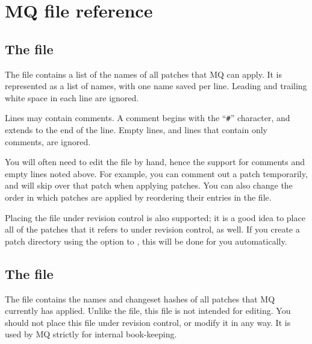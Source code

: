 \section{MQ file reference}


\subsection{The  file}

The  file contains a list of the names of all
patches that MQ can apply.  It is represented as a list of names, with
one name saved per line.  Leading and trailing white space in each
line are ignored.

Lines may contain comments.  A comment begins with the ``\texttt{\#}''
character, and extends to the end of the line.  Empty lines, and lines
that contain only comments, are ignored.

You will often need to edit the  file by hand, hence
the support for comments and empty lines noted above.  For example,
you can comment out a patch temporarily, and  will skip
over that patch when applying patches.  You can also change the order
in which patches are applied by reordering their entries in the
 file.

Placing the  file under revision control is also
supported; it is a good idea to place all of the patches that it
refers to under revision control, as well.  If you create a patch
directory using the  option to , this
will be done for you automatically.
\subsection{The  file}

The  file contains the names and changeset hashes of
all patches that MQ currently has applied.  Unlike the
 file, this file is not intended for editing.  You
should not place this file under revision control, or modify it in any
way.  It is used by MQ strictly for internal book-keeping.

